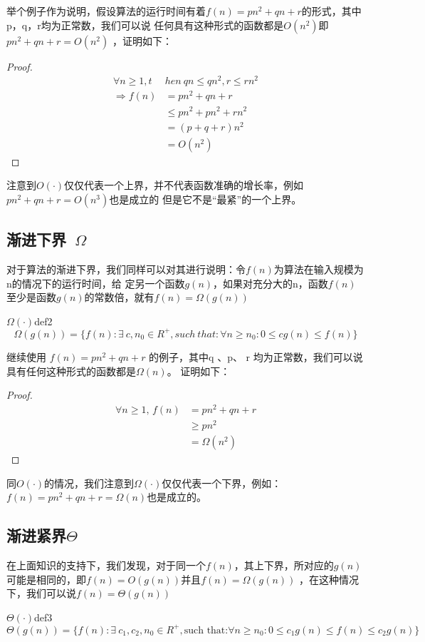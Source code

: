 举个例子作为说明，假设算法的运行时间有着$f(n)=pn^2+qn+r$的形式，其中p，q，r均为正常数，我们可以说
任何具有这种形式的函数都是$O(n^2)$即$pn^2+qn+r=O(n^2)$ ，证明如下：
\begin{proof}
	\begin{align*}
		\forall n \geq 1,t     & hen\ qn\leq qn^2,r\leq rn^2 \\
		\Longrightarrow   f(n) & =pn^2+qn+r                  \\
		                       & \leq pn^2+pn^2+rn^2         \\
		                       & =(p+q+r)n^2                 \\
		                       & = O(n^2)
	\end{align*}
\end{proof}
注意到$O(\cdot)$仅仅代表一个上界，并不代表函数准确的增长率，例如$pn^2+qn+r=O(n^3)$也是成立的
但是它不是“最紧”的一个上界。
\subsection{渐进下界\ $\Omega$}
对于算法的渐进下界，我们同样可以对其进行说明：令$f(n)$为算法在输入规模为n的情况下的运行时间，给
定另一个函数$g(n)$，如果对充分大的n，函数$f(n)$至少是函数$g(n)$的常数倍，就有$f(n)=\Omega(g(n))$
\begin{definition}{$\Omega(\cdot)$}{def2}
	\[
		\Omega (g(n))= \{f(n): \exists\ c,n_0\in R^+,such\ that: \forall n\ge n_0:0\le cg(n)\le f(n)\}
	\]
\end{definition}

继续使用 $f(n)=pn^2+qn+r$ 的例子，其中q 、p、 r 均为正常数，我们可以说具有任何这种形式的函数都是$\Omega(n)$。
证明如下：
\begin{proof}
	\begin{align*}
		\forall n \geq 1,\,f(n) & =pn^2+qn+r     \\
		                        & \geq pn^2      \\
		                        & = \Omega (n^2)
	\end{align*}
\end{proof}

同$O(\cdot)$的情况，我们注意到$\Omega(\cdot)$仅仅代表一个下界，例如：$f(n)=pn^2+qn+r=\Omega(n)$也是成立的。

\subsection{渐进紧界$\Theta$}
在上面知识的支持下，我们发现，对于同一个$f(n)$，其上下界，所对应的$g(n)$可能是相同的，即$f(n)=O(g(n))$并且$f(n)=\Omega(g(n))$
，在这种情况下，我们可以说$f(n)=\Theta(g(n))$
\begin{definition}{$\Theta(\cdot)$}{def3}
	\[
		\Theta(g(n)) = \{f(n): \exists\ c_1,c_2,n_0\in R^+,\text{such that:} \forall n\ge n_0:0\le c_1 g(n)\le f(n)\le c_2 g(n)\}
	\]
\end{definition}

